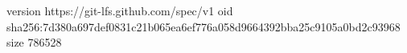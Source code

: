version https://git-lfs.github.com/spec/v1
oid sha256:7d380a697def0831c21b065ea6ef776a058d9664392bba25c9105a0bd2c93968
size 786528
